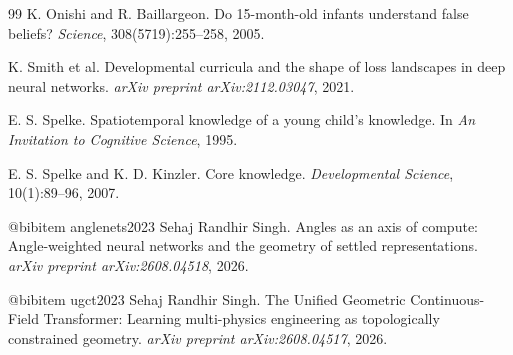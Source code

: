 \documentclass[11pt,oneside]{article}
\begin{document}
\begin{thebibliography}{99}
K. Onishi and R. Baillargeon.
\newblock Do 15-month-old infants understand false beliefs?
\newblock \emph{Science}, 308(5719):255--258, 2005.

K. Smith et al.
\newblock Developmental curricula and the shape of loss landscapes in deep neural networks.
\newblock \emph{arXiv preprint arXiv:2112.03047}, 2021.

E. S. Spelke.
\newblock Spatiotemporal knowledge of a young child's knowledge.
\newblock In \emph{An Invitation to Cognitive Science}, 1995.

E. S. Spelke and K. D. Kinzler.
\newblock Core knowledge.
\newblock \emph{Developmental Science}, 10(1):89--96, 2007.

@bibitem{ anglenets2023 }
Sehaj Randhir Singh.
\newblock Angles as an axis of compute: Angle-weighted neural networks and the geometry of settled representations.
\newblock \emph{arXiv preprint arXiv:2608.04518}, 2026.

@bibitem{ ugct2023 }
Sehaj Randhir Singh.
\newblock The Unified Geometric Continuous-Field Transformer: Learning multi-physics engineering as topologically constrained geometry.
\newblock \emph{arXiv preprint arXiv:2608.04517}, 2026.

\end{thebibliography}
\end{document}
